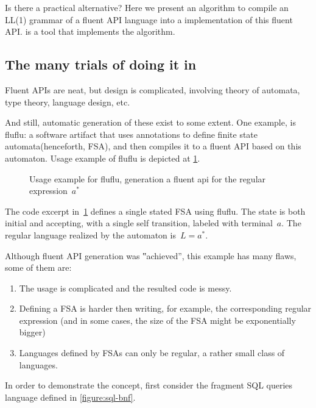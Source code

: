 Is there a practical alternative? Here we present an algorithm to compile an
LL(1) grammar of a fluent API language into a \Java implementation of this
fluent API. \Fajita is a tool that implements the algorithm.


\subsection{The many trials of doing it in \Java}
Fluent APIs are neat, but design is complicated,
involving theory of automata, type theory, language design, etc.

And still, automatic generation of these exist to some extent.
One example, is fluflu: a software artifact that uses
\Java annotations to define finite state automata(henceforth, FSA), and then
compiles it to a fluent API based on this automaton. Usage example of fluflu is
depicted at \cref{figure:fluflu}.

\begin{figure}[ht]
  \caption{\label{figure:fluflu}
    Usage example for fluflu, generation a fluent
  api for the regular expression~$a^*$}
\end{figure}
The code excerpt in~\cref{figure:fluflu} defines a single stated FSA using
fluflu. The state is both initial and accepting, with a single self
transition, labeled with terminal~$a$. The regular language realized by the
automaton is~$L=a^*$.

Although fluent API generation was ‟achieved”, this example has many flaws, some of them are:

\begin{enumerate}
  \item The usage is complicated and the resulted code is messy.
  \item Defining a FSA is harder then writing, for example, the corresponding regular
        expression (and in some cases, the size of the FSA might be exponentially bigger)
  \item Languages defined by FSAs can only be regular, a rather small
        class of languages.
\end{enumerate}


In order to demonstrate the concept, first consider the fragment SQL queries
language defined in \cref{figure:sql-bnf}.

